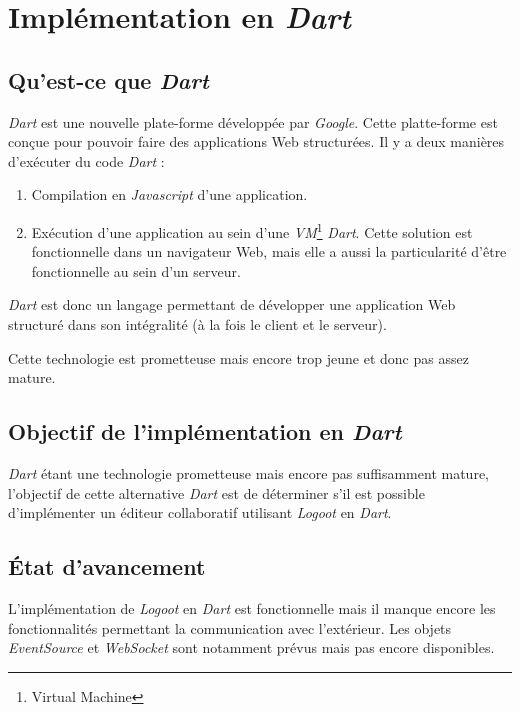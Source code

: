 \section{Implémentation en \emph{Dart}}
  \subsection{Qu'est-ce que \emph{Dart}}
    \emph{Dart} est une nouvelle plate-forme développée par \emph{Google}. Cette
    platte-forme est conçue pour pouvoir faire des applications Web structurées.
    Il y a deux manières d'exécuter du code \emph{Dart} :
    \begin{enumerate}
      \item Compilation en \emph{Javascript} d'une application.
      \item Exécution d'une application au sein d'une \emph{VM}\footnote{Virtual
            Machine} \emph{Dart}. Cette solution est fonctionnelle dans un
            navigateur Web, mais elle a aussi la particularité d'être
            fonctionnelle au sein d'un serveur.
    \end{enumerate}
    \emph{Dart} est donc un langage permettant de développer une application Web
    structuré dans son intégralité (à la fois le client et le serveur).

    Cette technologie est prometteuse mais encore trop jeune et donc pas assez
    mature.

  \subsection{Objectif de l'implémentation en \emph{Dart}}
    \emph{Dart} étant une technologie prometteuse mais encore pas suffisamment
    mature, l'objectif de cette alternative \emph{Dart} est de déterminer s'il
    est possible d'implémenter un éditeur collaboratif utilisant \emph{Logoot}
    en \emph{Dart}.

  \subsection{État d'avancement}
    L'implémentation de \emph{Logoot} en \emph{Dart} est fonctionnelle mais il
    manque encore les fonctionnalités permettant la communication avec
    l'extérieur. Les objets \emph{EventSource} et \emph{WebSocket} sont
    notamment prévus mais pas encore disponibles.

